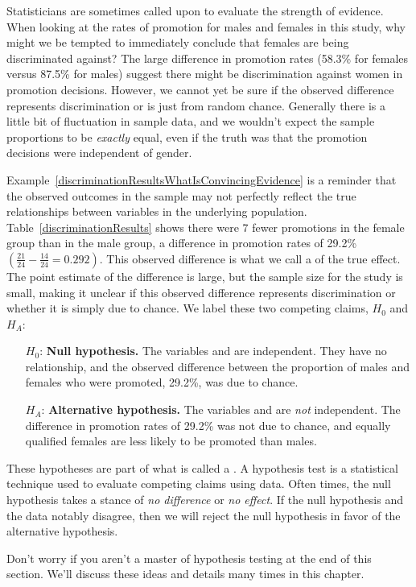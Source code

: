 \begin{example}{Statisticians are sometimes called upon to evaluate the strength of evidence. When looking at the rates of promotion for males and females in this study, why might we be tempted to immediately conclude that females are being discriminated against?}\label{discriminationResultsWhatIsConvincingEvidence}
The large difference in promotion rates (58.3\% for females versus 87.5\% for males) suggest there might be discrimination against women in promotion decisions. However, we cannot yet be sure if the observed difference represents discrimination or is just from random chance. Generally there is a little bit of fluctuation in sample data, and we wouldn't expect the sample proportions to be \emph{exactly} equal, even if the truth was that the promotion decisions were independent of gender.
\end{example}

Example~\ref{discriminationResultsWhatIsConvincingEvidence} is a reminder that the observed outcomes in the sample may not perfectly reflect the true relationships between variables in the underlying population. Table~\ref{discriminationResults} shows there were 7 fewer promotions in the female group than in the male group, a difference in promotion rates of 29.2\% $\left( \frac{21}{24} - \frac{14}{24} = 0.292 \right)$. This observed difference is what we call a  of the true effect. The point estimate of the difference is large, but the sample size for the study is small, making it unclear if this observed difference represents discrimination or whether it is simply due to chance. We label these two competing claims, $H_0$ and $H_A$:
\begin{itemize}
\setlength{\itemsep}{0mm}
\item[$H_0$:] \textbf{Null hypothesis.} The variables  and  are independent. They have no relationship, and the observed difference between the proportion of males and females who were promoted, 29.2\%, was due to chance.
\item[$H_A$:] \textbf{Alternative hypothesis.} The variables  and  are \emph{not} independent. The difference in promotion rates of 29.2\% was not due to chance, and equally qualified females are less likely to be promoted than males.
\end{itemize}

\begin{termBox}{
These hypotheses are part of what is called a . A hypothesis test is a statistical technique used to evaluate competing claims using data. Often times, the null hypothesis takes a stance of \emph{no difference} or \emph{no effect}. If the null hypothesis and the data notably disagree, then we will reject the null hypothesis in favor of the alternative hypothesis. \vspace{3mm}

Don't worry if you aren't a master of hypothesis testing at the end of this section. We'll discuss these ideas and details many times in this chapter.}
\end{termBox}

